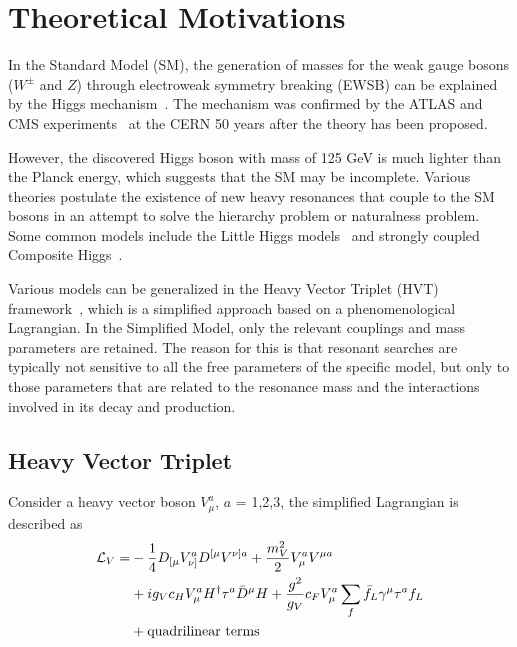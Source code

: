 \section{Theoretical Motivations}

In the Standard Model (SM), the generation of masses for the weak gauge bosons ($W^\pm$ and $Z$) through electroweak symmetry breaking (EWSB) can be explained by the Higgs mechanism~\cite{PhysRevLett.13.508}. The mechanism was confirmed by the ATLAS and CMS experiments~\cite{Aad:2012tfa,Chatrchyan:2012xdj,Chatrchyan:2013lba} at the CERN 50 years after the theory has been proposed.

However, the discovered Higgs boson with mass of 125 GeV is much lighter than the Planck energy, which suggests that the SM may be incomplete. Various theories postulate the existence of new heavy resonances that couple to the SM bosons in an attempt to solve the hierarchy problem or naturalness problem. Some common models include the Little Higgs models~\cite{Han:2003wu,Perelstein:2005ka} and strongly coupled Composite Higgs~\cite{Contino:2011np,Marzocca:2012zn}. 

Various models can be generalized in the Heavy Vector Triplet (HVT) framework~\cite{Pappadopulo:2014qza}, which is a simplified approach based on a phenomenological Lagrangian. In the Simplified Model, only the relevant couplings and mass parameters are retained. The reason for this is that resonant searches are typically not sensitive to all the free parameters of the specific model, but only to those parameters that are related to the resonance mass and the interactions involved in its decay and production.

\subsection{Heavy Vector Triplet} \label{sec:hvtmodel}

Consider a heavy vector boson $V_\mu^a$, $a$ = 1,2,3, the simplified Lagrangian is described as
\begin{equation} \label{eq:simpleLag}
  \begin{aligned}
    \mathcal{L}_V = &-\frac{1}{4}D_{[\mu}V_{\nu]}^aD^{[\mu}V^{\nu]a}+\frac{m_V^2}{2}V_\mu^aV^{\mu a}\\
    &+ig_Vc_HV_\mu^aH^\dagger\tau^a\bar{D}^\mu H+\frac{g^2}{g_V}c_FV_\mu^a\sum\limits_{f}\bar{f}_L\gamma^\mu\tau^af_L\\
    &+\textup{quadrilinear terms}
  \end{aligned}
\end{equation}

